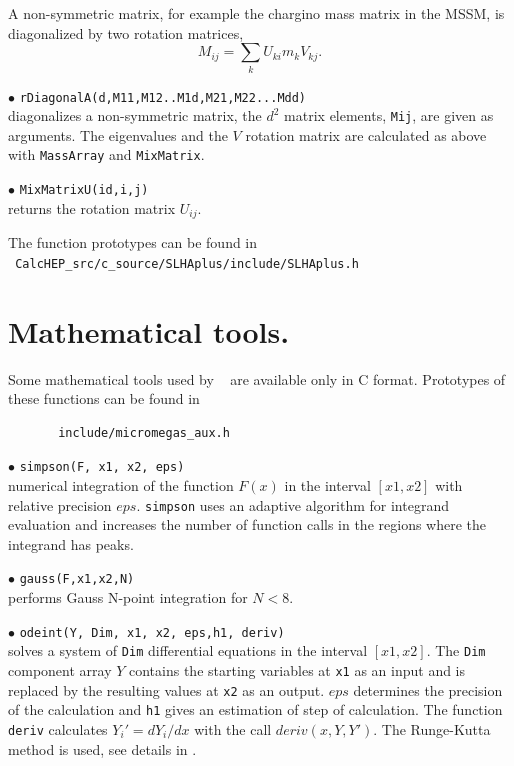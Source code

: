 \documentclass[12pt,a4paper]{article}
\begin{document}
{A non-symmetric matrix, for example the 
chargino mass matrix in the  MSSM, is diagonalized by  two rotation matrices,
$$  M_{ij} = \sum\limits_k  U_{ki} m_k V_{kj}.$$ 

\noindent
$\bullet$ \verb|rDiagonalA(d,M11,M12..M1d,M21,M22...Mdd)|\\ 
diagonalizes a non-symmetric matrix, the $d^2$  matrix elements, \verb|Mij|, are given as arguments.
The eigenvalues and the $V$ rotation matrix are calculated as above with 
\verb|MassArray| and \verb|MixMatrix|. 

\noindent
$\bullet$ \verb|MixMatrixU(id,i,j)|\\
returns the rotation matrix $U_{ij}$.

The function prototypes can be found in \\
\noindent
\verb| CalcHEP_src/c_source/SLHAplus/include/SLHAplus.h|

\section{Mathematical tools.}

Some mathematical tools used by \micro~ are available only 
in C format. Prototypes of these functions can be found in
\begin{verbatim}
       include/micromegas_aux.h 
\end{verbatim}

\noindent$\bullet$ \verb|simpson(F, x1, x2, eps)|\\
numerical integration of the function $F(x)$ in the interval $[x1,x2]$  
with relative precision $eps$. \verb|simpson| uses an adaptive algorithm 
for integrand evaluation and increases the number of function calls in 
the regions where the  integrand has peaks. 

\noindent$\bullet$ \verb|gauss(F,x1,x2,N)|\\
performs Gauss N-point integration for $N<8$.  

\noindent$\bullet$ \verb|odeint(Y, Dim, x1, x2, eps,h1, deriv)|\\
solves a  system of \verb|Dim| differential  equations in the interval 
$[x1,x2]$. The  \verb|Dim| component array $Y$ contains the starting variables at \verb|x1| as an input and is replaced by the
resulting values at \verb|x2| as an output. $eps$ determines the precision of the 
calculation and  \verb|h1| gives an estimation of step of calculation.  
The function \verb|deriv| calculates 
$Y_i' = dY_i/dx$ with the call $deriv(x,Y,Y')$. The Runge-Kutta method is
used, see details in \cite{Numerical}. 


}
\end{document}

